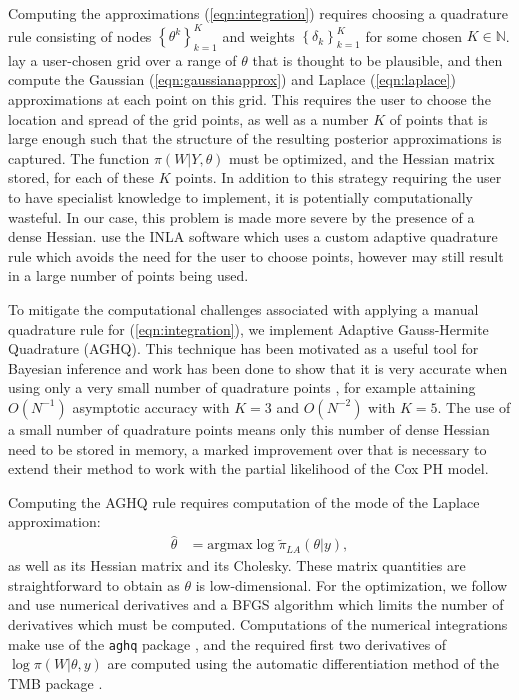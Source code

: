 \documentclass[ba]{imsart}
\begin{document}
Computing the approximations (\ref{eqn:integration}) requires choosing a quadrature rule consisting of nodes $\left\{\theta^{k}\right\}_{k=1}^{K}$ and weights $\left\{\delta_{k}\right\}_{k=1}^{K}$ for some chosen $K\in\mathbb{N}$. \cite{casecross} lay a user-chosen grid over a range of $\theta$ that is thought to be plausible, and then compute the Gaussian (\ref{eqn:gaussianapprox}) and Laplace (\ref{eqn:laplace}) approximations at each point on this grid. This requires the user to choose the location and spread of the grid points, as well as a number $K$
of points that is large enough such that the structure of the resulting posterior approximations is captured. The function $\pi(W|Y,\theta)$ must be optimized, and the Hessian matrix stored, for each of these $K$ points. In addition to this strategy requiring the user to have specialist knowledge to implement, it is potentially computationally wasteful. In our case, this problem is made more severe by the presence of a dense Hessian. \cite{inlacoxph} use the INLA software which uses a custom adaptive quadrature rule which avoids the need for the user to choose points, however may still result in a large number of points being used.


To mitigate the computational challenges associated with applying a manual quadrature rule for (\ref{eqn:integration}), we implement Adaptive Gauss-Hermite Quadrature (AGHQ). This technique has been motivated as a useful tool for Bayesian inference \citep{nayloradaptive} and work has been done to show that it is very accurate when using only a very small number of quadrature points \citep{adaptive_GH_1994,adaptive_GH_2020}, for example attaining $O(N^{-1})$ asymptotic accuracy with $K = 3$ and $O(N^{-2})$ with $K = 5$. The use of a small number of quadrature points means only this number of dense Hessian need to be stored in memory, a marked improvement over \cite{casecross} that is necessary to extend their method to work with the partial likelihood of the Cox PH model.


Computing the AGHQ rule requires computation of the mode of the Laplace approximation:
\begin{equation}\begin{aligned}
\widehat{\theta} &= \text{argmax}\log\widetilde{\pi}_{LA}(\theta|y),
\end{aligned}\end{equation}
as well as its Hessian matrix and its Cholesky. These matrix quantities are straightforward to obtain as $\theta$ is low-dimensional. For the optimization, we follow \citet{inla} and use numerical derivatives and a BFGS algorithm which limits the number of derivatives which must be computed. Computations of the numerical integrations make use of the \texttt{aghq} package \citep{stringeraghqpackage}, and the required first two derivatives of $\log\pi(W|\theta,y)$ are computed using the automatic differentiation method of the TMB package \citep{tmb}.
\end{document}
